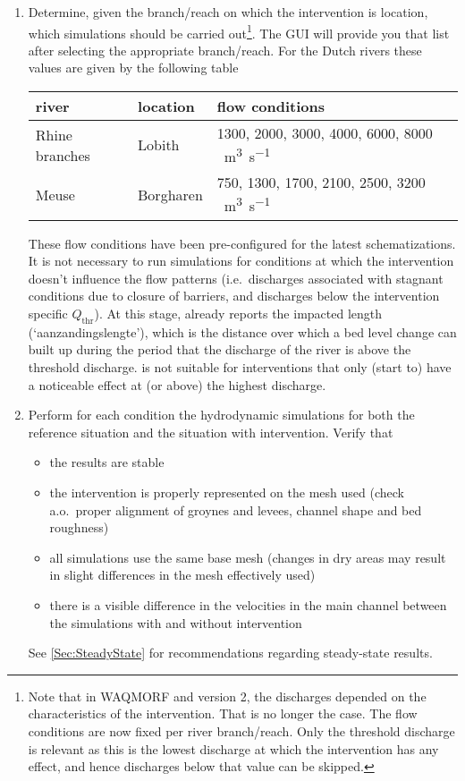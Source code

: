 \begin{enumerate}
\item Determine, given the branch/reach on which the intervention is location, which \dflowfm simulations should be carried out\footnote{Note that in WAQMORF and \dfmi version 2, the discharges depended on the characteristics of the intervention.
That is no longer the case.
The flow conditions are now fixed per river branch/reach.
Only the threshold discharge is relevant as this is the lowest discharge at which the intervention has any effect, and hence discharges below that value can be skipped.}.
The \dfmi GUI will provide you that list after selecting the appropriate branch/reach.
For the Dutch rivers these values are given by the following table
\newline
\newline
\begin{tabular}{l|l|l}
river & location & flow conditions \\ \hline
Rhine branches & Lobith & 1300, 2000, 3000, 4000, 6000, 8000 \SI{}{\metre\cubed\per\second}\\
Meuse & Borgharen & 750, 1300, 1700, 2100, 2500, 3200 \SI{}{\metre\cubed\per\second}
\end{tabular}
\newline
\newline
These flow conditions have been pre-configured for the latest \dflowfm schematizations.
It is not necessary to run simulations for conditions at which the intervention doesn't influence the flow patterns (i.e.~discharges associated with stagnant conditions due to closure of barriers, and discharges below the intervention specific $Q_\text{thr}$).
At this stage, \dfmi already reports the impacted length (`aanzandingslengte'), which is the distance over which a bed level change can built up during the period that the discharge of the river is above the threshold discharge.
\dfmi is not suitable for interventions that only (start to) have a noticeable effect at (or above) the highest discharge.

\item Perform for each condition the hydrodynamic simulations for both the reference situation and the situation with intervention.
Verify that
\begin{itemize}
\item the \dflowfm results are stable
\item the intervention is properly represented on the mesh used (check a.o.~proper alignment of groynes and levees, channel shape and bed roughness)
\item all simulations use the same base mesh (changes in dry areas may result in slight differences in the mesh effectively used)
\item there is a visible difference in the velocities in the main channel between the simulations with and without intervention
\end{itemize}
See \autoref{Sec:SteadyState} for recommendations regarding steady-state results.


\end{enumerate}
